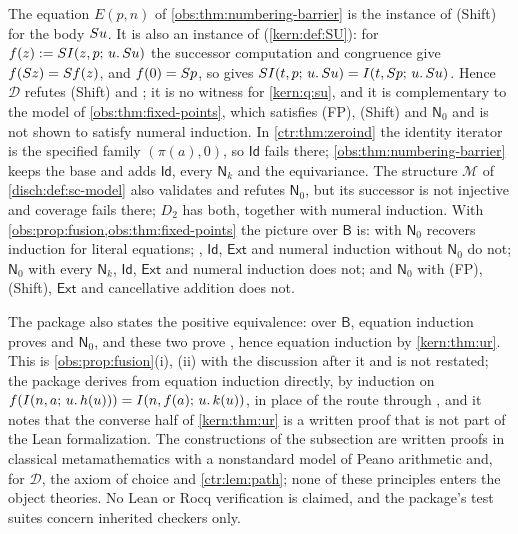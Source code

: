 \begin{remark}
\label{obs:rem:barriers}
The equation $E(p,n)$ of \cref{obs:thm:numbering-barrier} is the instance of
(Shift) for the body $S u$. It is also an instance of 
(\cref{kern:def:SU}): for $f(z)\mathrel{:=}SI(z,p;\,u.\,S u)$ the successor
computation and congruence give $f(S z)=S f(z)$, and $f(0)=S p$, so
 gives $SI(t,p;\,u.\,S u)=I(t,S p;\,u.\,S u)$.
Hence $\mathcal{D}$ refutes (Shift) and ; it is no witness for
\cref{kern:q:su}, and it is complementary to the model of
\cref{obs:thm:fixed-points}, which satisfies (FP), (Shift) and $\mathsf{N}_0$
and is not shown to satisfy numeral induction. In \cref{ctr:thm:zeroind} the
identity iterator is the specified family $(\pi(a),0)$, so $\mathsf{Id}$ fails
there; \cref{obs:thm:numbering-barrier} keeps the base and adds $\mathsf{Id}$,
every $\mathsf{N}_k$ and the equivariance. The structure $\mathcal{M}$ of
\cref{disch:def:sc-model} also validates  and refutes
$\mathsf{N}_0$, but its successor is not injective and coverage fails there;
$D_2$ has both, together with numeral induction. With
\cref{obs:prop:fusion,obs:thm:fixed-points} the picture over $\mathsf{B}$ is:
 with $\mathsf{N}_0$ recovers induction for literal equations;
, $\mathsf{Id}$, $\mathsf{Ext}$ and numeral induction without
$\mathsf{N}_0$ do not; $\mathsf{N}_0$ with every $\mathsf{N}_k$, $\mathsf{Id}$,
$\mathsf{Ext}$ and numeral induction does not; and $\mathsf{N}_0$ with (FP),
(Shift), $\mathsf{Ext}$ and cancellative addition does not.

The package also states the positive equivalence: over $\mathsf{B}$, equation
induction proves  and $\mathsf{N}_0$, and these two prove
, hence equation induction by \cref{kern:thm:ur}. This is
\cref{obs:prop:fusion}(i), (ii) with the discussion after it and is not
restated; the package derives  from equation induction
directly, by induction on $f(I(n,a;\,u.\,h(u)))=I(n,f(a);\,u.\,k(u))$, in
place of the route through , and it notes that the converse half
of \cref{kern:thm:ur} is a written proof that is not part of the Lean
formalization. The constructions of the subsection are written proofs in
classical metamathematics with a nonstandard model of Peano arithmetic and,
for $\mathcal{D}$, the axiom of choice and \cref{ctr:lem:path}; none of these
principles enters the object theories. No Lean or Rocq verification is
claimed, and the package's test suites concern inherited checkers only.
\end{remark}

